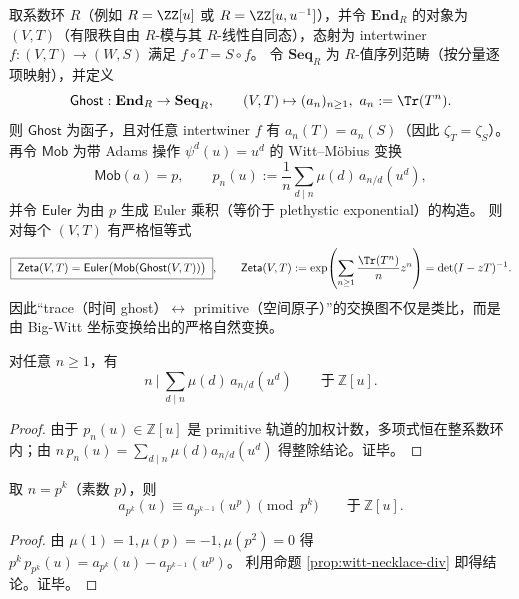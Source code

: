 \begin{proposition}\label{prop:witt-bridge-functorial}
取系数环 \(R\)（例如 \(R=\ZZ[u]\) 或 \(R=\ZZ[u,u^{-1}]\)），并令 \(\mathbf{End}_R\) 的对象为 \((V,T)\)（有限秩自由 \(R\)-模与其 \(R\)-线性自同态），态射为 intertwiner \(f:(V,T)\to (W,S)\) 满足 \(f\circ T=S\circ f\)。
令 \(\mathbf{Seq}_R\) 为 \(R\)-值序列范畴（按分量逐项映射），并定义
\[
\mathsf{Ghost}:\mathbf{End}_R\to \mathbf{Seq}_R,\qquad
(V,T)\mapsto (a_n)_{n\ge 1},\ a_n:=\Tr(T^n).
\]
则 \(\mathsf{Ghost}\) 为函子，且对任意 intertwiner \(f\) 有 \(a_n(T)=a_n(S)\)（因此 \(\zeta_T=\zeta_S\)）。
再令 \(\mathsf{Mob}\) 为带 Adams 操作 \(\psi^d(u)=u^d\) 的 Witt--Möbius 变换
\[
\mathsf{Mob}(a)=p,\qquad
p_n(u):=\frac1n\sum_{d\mid n}\mu(d)\,a_{n/d}(u^d),
\]
并令 \(\mathsf{Euler}\) 为由 \(p\) 生成 Euler 乘积（等价于 plethystic exponential）的构造。
则对每个 \((V,T)\) 有严格恒等式
\[
\boxed{\;
\mathsf{Zeta}(V,T)
=\mathsf{Euler}\bigl(\mathsf{Mob}(\mathsf{Ghost}(V,T))\bigr)\; },
\qquad
\mathsf{Zeta}(V,T):=\exp\!\left(\sum_{n\ge 1}\frac{\Tr(T^n)}{n}z^n\right)=\det(I-zT)^{-1}.
\]
因此“trace（时间 ghost）\(\leftrightarrow\) primitive（空间原子）”的交换图不仅是类比，而是由 Big-Witt 坐标变换给出的严格自然变换。
\end{proposition}

\begin{proposition}\label{prop:witt-necklace-div}
对任意 $n\ge 1$，有
\[
n\ \Big|\ \sum_{d\mid n}\mu(d)\,a_{n/d}(u^d)\qquad\text{于}\ \mathbb{Z}[u].
\]
\end{proposition}
\begin{proof}
由于 $p_n(u)\in\mathbb{Z}[u]$ 是 primitive 轨道的加权计数，多项式恒在整系数环内；由 $n\,p_n(u)=\sum_{d\mid n}\mu(d)a_{n/d}(u^d)$ 得整除结论。证毕。
\end{proof}

\begin{corollary}\label{cor:witt-dwork-congruence}
取 $n=p^k$（素数 $p$），则
\[
a_{p^k}(u)\equiv a_{p^{k-1}}(u^p)\pmod{p^k}\qquad\text{于}\ \mathbb{Z}[u].
\]
\end{corollary}
\begin{proof}
由 $\mu(1)=1,\mu(p)=-1,\mu(p^2)=0$ 得
\(
p^k\,p_{p^k}(u)=a_{p^k}(u)-a_{p^{k-1}}(u^p)
\)。
利用命题 \ref{prop:witt-necklace-div} 即得结论。证毕。
\end{proof}



